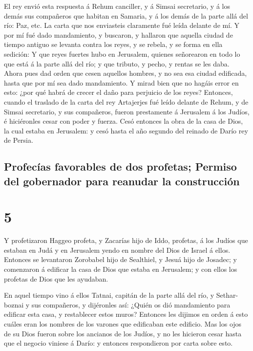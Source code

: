  El rey envió esta respuesta á Rehum canciller, y á
Simsai secretario, y á los demás sus compañeros que habitan en Samaria,
y á los demás de la parte allá del río: Paz, etc.  La
carta que nos enviasteis claramente fué leída delante de mí.
 Y por mí fué dado mandamiento, y buscaron, y hallaron
que aquella ciudad de tiempo antiguo se levanta contra los reyes, y se
rebela, y se forma en ella sedición:  Y que reyes fuertes
hubo en Jerusalem, quienes señorearon en todo lo que está á la parte
allá del río; y que tributo, y pecho, y rentas se les daba.
 Ahora pues dad orden que cesen aquellos hombres, y no
sea esa ciudad edificada, hasta que por mí sea dado mandamiento.
 Y mirad bien que no hagáis error en esto: ¿por qué habrá
de crecer el daño para perjuicio de los reyes?  Entonces,
cuando el traslado de la carta del rey Artajerjes fué leído delante de
Rehum, y de Simsai secretario, y sus compañeros, fueron prestamente á
Jerusalem á los Judíos, é hiciéronles cesar con poder y fuerza.
 Cesó entonces la obra de la casa de Dios, la cual estaba
en Jerusalem: y cesó hasta el año segundo del reinado de Darío rey de
Persia.

\hypertarget{profecuxedas-favorables-de-dos-profetas-permiso-del-gobernador-para-reanudar-la-construcciuxf3n}{%
\subsection{Profecías favorables de dos profetas; Permiso del gobernador
para reanudar la
construcción}\label{profecuxedas-favorables-de-dos-profetas-permiso-del-gobernador-para-reanudar-la-construcciuxf3n}}

\hypertarget{section-4}{%
\section{5}\label{section-4}}

 Y profetizaron Haggeo profeta, y Zacarías hijo de Iddo,
profetas, á los Judíos que estaban en Judá y en Jerusalem yendo en
nombre del Dios de Israel á ellos.  Entonces se levantaron
Zorobabel hijo de Sealthiel, y Jesuá hijo de Josadec; y comenzaron á
edificar la casa de Dios que estaba en Jerusalem; y con ellos los
profetas de Dios que les ayudaban.

 En aquel tiempo vino á ellos Tatnai, capitán de la parte
allá del río, y Sethar-boznai y sus compañeros, y dijéronles así: ¿Quién
os dió mandamiento para edificar esta casa, y restablecer estos muros?
 Entonces les dijimos en orden á esto cuáles eran los
nombres de los varones que edificaban este edificio.  Mas
los ojos de su Dios fueron sobre los ancianos de los Judíos, y no les
hicieron cesar hasta que el negocio viniese á Darío: y entonces
respondieron por carta sobre esto.


